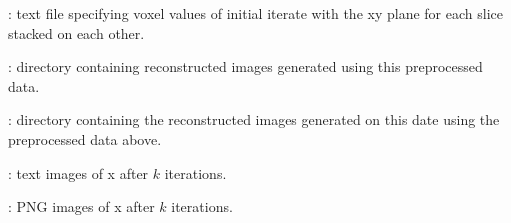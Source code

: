 \begin{tcbfunctionenv}
\begin{tcbparagraph}
\begin{deepList}[labelindent=1pt, leftmargin=*]
\begin{deepList}[labelindent=1pt, leftmargin=*]
\begin{deepList}[labelindent=1pt, leftmargin=*]
\begin{deepList}[labelindent=1pt, leftmargin=*]
\begin{deepList}[labelindent=1pt, leftmargin=*]
\begin{deepList}[labelindent=1pt, leftmargin=*]
\begin{deepList}[labelindent=1pt, leftmargin=*]
\begin{deepList}[labelindent=1pt, leftmargin=*]
\begin{deepList}[labelindent=1pt, leftmargin=*]
                                        \item {} : text file specifying voxel values of initial iterate with the xy plane for each slice stacked on each other.
                                        \item {} : directory containing reconstructed images generated using this preprocessed data.
\newpage
                                        \begin{deepList}[labelindent=1pt, leftmargin=*]
                                            \item {} : directory containing the reconstructed images generated on this date using the preprocessed data above.
                                                \begin{deepList}[labelindent=1pt, leftmargin=*]
                                                    \item {} : text images of x after $k$ iterations.
                                                    \item {} : PNG images of x after $k$ iterations.
                                                \end{deepList}
                                        \end{deepList}
                                    \end{deepList}
                                \end{deepList}
                            \end{deepList}
                        \end{deepList}
                    \end{deepList}
                \end{deepList}
            \end{deepList}
        \end{deepList}
    \end{deepList}
\end{tcbparagraph}
\end{tcbfunctionenv}
\endinput